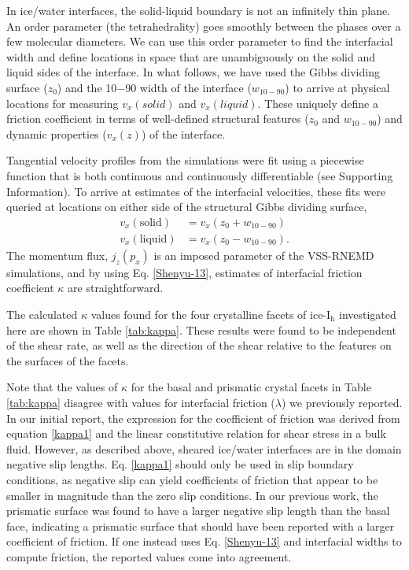 In ice/water interfaces, the solid-liquid boundary is not
an infinitely thin plane. An order parameter (the tetrahedrality) goes
smoothly between the phases over a few molecular diameters.  We can
use this order parameter to find the interfacial width and define
locations in space that are unambiguously on the solid and liquid
sides of the interface.  In what follows, we have used the Gibbs
dividing surface ($z_0$) and the 10$-$90 width of the interface
($w_\mathrm{10-90}$) to arrive at physical locations for measuring
$v_{x}(solid)$ and $v_{x}(liquid)$.  These uniquely define a friction
coefficient in terms of well-defined structural features ($z_0$ and
$w_\mathrm{10-90}$) and dynamic properties ($v_{x}(z)$) of the
interface.

Tangential velocity profiles from the simulations were fit using a
piecewise function that is both continuous and continuously
differentiable (see Supporting Information). To arrive at estimates of
the interfacial velocities, these fits were queried at locations on
either side of the structural Gibbs dividing surface,
\begin{align*}
v_{x}(\mathrm{solid}) & = v_{x}( z_0 + w_\mathrm{10-90}) \\
v_{x}(\mathrm{liquid}) & = v_{x}( z_0 - w_\mathrm{10-90}).
\end{align*}
The momentum flux, $j_{z}(p_{x})$ is an imposed parameter of the
VSS-RNEMD simulations, and by using Eq. \eqref{Shenyu-13}, estimates
of interfacial friction coefficient $\kappa$ are straightforward.

The calculated $\kappa$ values found for the four crystalline facets
of ice-I$_\mathrm{h}$ investigated here are shown in Table
\ref{tab:kappa}.  These results were found to be independent of the
shear rate, as well as the direction of the shear relative to the
features on the surfaces of the facets.

Note that the values of $\kappa$ for the basal and prismatic crystal
facets in Table \ref{tab:kappa} disagree with values for interfacial
friction ($\lambda$) we previously reported.\cite{Louden2013} In our
initial report, the expression for the coefficient of friction was
derived from equation \eqref{kappa1} and the linear constitutive
relation for shear stress in a bulk fluid.  However, as described
above, sheared ice/water interfaces are in the domain negative slip
lengths. Eq. \eqref{kappa1} should only be used in slip boundary
conditions, as negative slip can yield coefficients of friction that
appear to be smaller in magnitude than the zero slip conditions. In
our previous work, the prismatic surface was found to have a larger
negative slip length than the basal face, indicating a prismatic
surface that should have been reported with a larger coefficient of
friction. If one instead uses Eq. \eqref{Shenyu-13} and interfacial
widths to compute friction, the reported values come into agreement.

